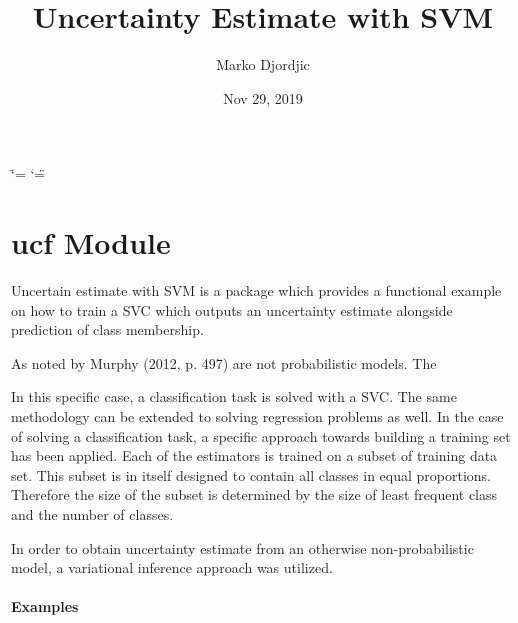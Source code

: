 \documentclass[letterpaper,10pt,english]{sphinxmanual}
\title{Uncertainty Estimate with SVM}
\date{Nov 29, 2019}
\author{Marko Djordjic}
\begin{document}
\ifdefined\shorthandoff
  \ifnum\catcode`\=\string=\active\shorthandoff{=}\fi
  \ifnum\catcode`\"=\active{}\fi
\fi

\pagestyle{empty}
\sphinxmaketitle
\pagestyle{plain}
\sphinxtableofcontents
\pagestyle{normal}
\label{\detokenize{index::doc}}



\chapter{ucf Module}
\label{\detokenize{index:module-ucf}}\label{\detokenize{index:ucf-module}}
Uncertain estimate with SVM is a package which provides a functional
example on how to train a SVC which outputs an uncertainty estimate
alongside prediction of class membership.

As noted by Murphy (2012, p. 497) are not probabilistic models. The

In this specific case, a classification task is solved with a SVC. The
same methodology can be extended to solving regression problems as well.
In the case of solving a classification task, a specific approach towards
building a training set has been applied. Each of the estimators is trained
on a subset of training data set. This subset is in itself designed to
contain all classes in equal proportions. Therefore the size of the subset
is determined by the size of least frequent class and the number of classes.

In order to obtain uncertainty estimate from an otherwise non-probabilistic
model, a variational inference approach was utilized.
\subsubsection*{Examples}
\end{document}
